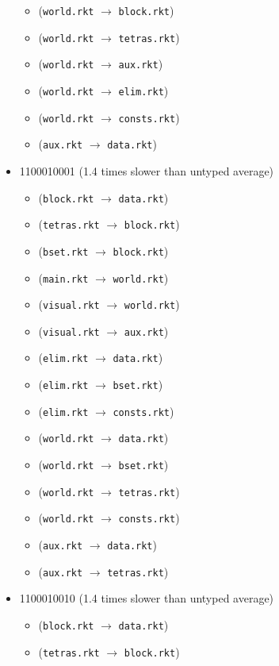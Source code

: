 \documentclass{article}
\newcommand{\mono}[1]{\texttt{#1}}
\begin{document}
\begin{itemize}
\begin{itemize}
  \item (\mono{world.rkt} $\rightarrow$ \mono{block.rkt})
  \item (\mono{world.rkt} $\rightarrow$ \mono{tetras.rkt})
  \item (\mono{world.rkt} $\rightarrow$ \mono{aux.rkt})
  \item (\mono{world.rkt} $\rightarrow$ \mono{elim.rkt})
  \item (\mono{world.rkt} $\rightarrow$ \mono{consts.rkt})
  \item (\mono{aux.rkt} $\rightarrow$ \mono{data.rkt})
  \end{itemize}
\item 1100010001 (1.4 times slower than untyped average)
  \begin{itemize}
  \item (\mono{block.rkt} $\rightarrow$ \mono{data.rkt})
  \item (\mono{tetras.rkt} $\rightarrow$ \mono{block.rkt})
  \item (\mono{bset.rkt} $\rightarrow$ \mono{block.rkt})
  \item (\mono{main.rkt} $\rightarrow$ \mono{world.rkt})
  \item (\mono{visual.rkt} $\rightarrow$ \mono{world.rkt})
  \item (\mono{visual.rkt} $\rightarrow$ \mono{aux.rkt})
  \item (\mono{elim.rkt} $\rightarrow$ \mono{data.rkt})
  \item (\mono{elim.rkt} $\rightarrow$ \mono{bset.rkt})
  \item (\mono{elim.rkt} $\rightarrow$ \mono{consts.rkt})
  \item (\mono{world.rkt} $\rightarrow$ \mono{data.rkt})
  \item (\mono{world.rkt} $\rightarrow$ \mono{bset.rkt})
  \item (\mono{world.rkt} $\rightarrow$ \mono{tetras.rkt})
  \item (\mono{world.rkt} $\rightarrow$ \mono{consts.rkt})
  \item (\mono{aux.rkt} $\rightarrow$ \mono{data.rkt})
  \item (\mono{aux.rkt} $\rightarrow$ \mono{tetras.rkt})
  \end{itemize}
\item 1100010010 (1.4 times slower than untyped average)
  \begin{itemize}
  \item (\mono{block.rkt} $\rightarrow$ \mono{data.rkt})
  \item (\mono{tetras.rkt} $\rightarrow$ \mono{block.rkt})

\end{itemize}
\end{itemize}
\end{document}
